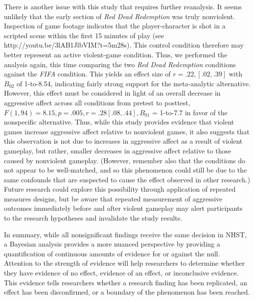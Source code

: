 \documentclass[man]{apa6}
\begin{document}
There is another issue with this study that requires further reanalysis. It seems unlikely that the early section of {\em Red Dead Redemption} was truly nonviolent. Inspection of game footage indicates that the player-character is shot in a scripted scene within the first 15 minutes of play (see http://youtu.be/3lAB1JlbVIM?t=5m28s). This control condition therefore may better represent an active violent-game condition.  Thus, we performed the analysis again, this time comparing the two {\em Red Dead Redemption} conditions against the {\em FIFA} condition. This yields an effect size of $r = .22, [.02, .39]$  with  $B_{02}$ of 1-to-8.54, indicating fairly strong support for the meta-analytic alternative. However, this effect must be considered in light of an overall decrease in aggressive affect across all conditions from pretest to posttest, $F(1, 94) = 8.15, p = .005, r = .28 [.08, .44], B_{01}$ = 1-to-7.7 in favor of the nonspecific alternative. Thus, while this study provides evidence that violent games increase aggressive affect relative to nonviolent games, it also suggests that this observation is not due to increases in aggressive affect as a result of violent gameplay, but rather, smaller decreases in aggressive affect relative to those caused by nonviolent gameplay. (However, remember also that the conditions do not appear to be well-matched, and so this phenomenon could still be due to the same confounds that are suspected to cause the effect observed in other research.) Future research could explore this possibility through application of repeated measures designs, but be aware that repeated measurement of aggressive outcomes immediately before and after violent gameplay may alert participants to the research hypotheses and invalidate the study results. 

In summary, while all nonsignificant findings receive the same decision in NHST, a Bayesian analysis provides a more nuanced perspective by providing a quantification of continuous amounts of evidence for or against the null. Attention to the strength of evidence will help researchers to determine whether they have evidence of no effect, evidence of an effect, or inconclusive evidence. This evidence tells researchers whether a research finding has been replicated, an effect has been disconfirmed, or a boundary of the phenomenon has been reached.
\end{document}
